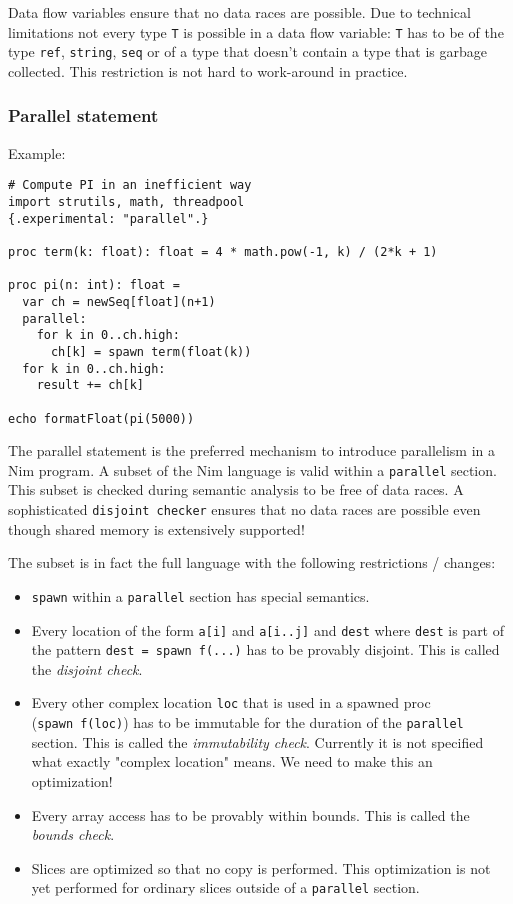 Data flow variables ensure that no data races are possible. Due to
technical limitations not every type \texttt{T} is possible in a data
flow variable: \texttt{T} has to be of the type \texttt{ref},
\texttt{string}, \texttt{seq} or of a type that doesn't contain a type
that is garbage collected. This restriction is not hard to work-around
in practice.

\hypertarget{parallel-statement}{%
\subsubsection{Parallel statement}\label{parallel-statement}}

Example:

\begin{verbatim}
# Compute PI in an inefficient way
import strutils, math, threadpool
{.experimental: "parallel".}

proc term(k: float): float = 4 * math.pow(-1, k) / (2*k + 1)

proc pi(n: int): float =
  var ch = newSeq[float](n+1)
  parallel:
    for k in 0..ch.high:
      ch[k] = spawn term(float(k))
  for k in 0..ch.high:
    result += ch[k]

echo formatFloat(pi(5000))
\end{verbatim}

The parallel statement is the preferred mechanism to introduce
parallelism in a Nim program. A subset of the Nim language is valid
within a \texttt{parallel} section. This subset is checked during
semantic analysis to be free of data races. A sophisticated
\texttt{disjoint\ checker} ensures that no data races are possible even
though shared memory is extensively supported!

The subset is in fact the full language with the following restrictions
/ changes:

\begin{itemize}
\tightlist
\item
  \texttt{spawn} within a \texttt{parallel} section has special
  semantics.
\item
  Every location of the form \texttt{a{[}i{]}} and \texttt{a{[}i..j{]}}
  and \texttt{dest} where \texttt{dest} is part of the pattern
  \texttt{dest\ =\ spawn\ f(...)} has to be provably disjoint. This is
  called the \emph{disjoint check}.
\item
  Every other complex location \texttt{loc} that is used in a spawned
  proc (\texttt{spawn\ f(loc)}) has to be immutable for the duration of
  the \texttt{parallel} section. This is called the \emph{immutability
  check}. Currently it is not specified what exactly "complex location"
  means. We need to make this an optimization!
\item
  Every array access has to be provably within bounds. This is called
  the \emph{bounds check}.
\item
  Slices are optimized so that no copy is performed. This optimization
  is not yet performed for ordinary slices outside of a
  \texttt{parallel} section.
\end{itemize}


